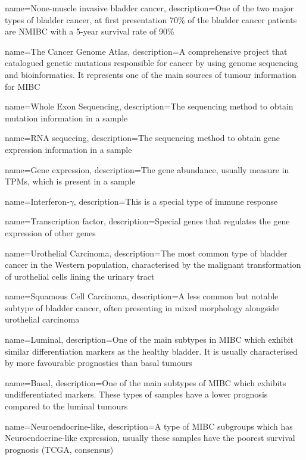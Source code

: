{
    name=None-muscle invasive bladder cancer,
    description={One of the two major types of bladder cancer, at first presentation 70\% of the bladder cancer patients are NMIBC with a 5-year survival rate of 90\%}
}

{
    name=The Cancer Genome Atlas,
    description={A comprehensive project that catalogued genetic mutations responsible for cancer by using genome sequencing and bioinformatics. It represents one of the main sources of tumour information for MIBC}
}

{
    name=Whole Exon Sequencing,
    description={The sequencing method to obtain mutation information in a sample}
}

{
    name=RNA sequecing,
    description={The sequencing method to obtain gene expression information in a sample}
}

{
    name=Gene expression,
    description={The gene abundance, usually measure in TPMs, which is present in a sample}
}

{
    name=Interferon-$\gamma$,
    description={This is a special type of immune response}
}

{
    name=Transcription factor,
    description={Special genes that regulates the gene expression of other genes}
}

{
    name=Urothelial Carcinoma,
    description={The most common type of bladder cancer in the Western population, characterised by the malignant transformation of urothelial cells lining the urinary tract}
}

{
    name=Squamous Cell Carcinoma,
    description={A less common but notable subtype of bladder cancer, often presenting in mixed morphology alongside urothelial carcinoma}
}


{
    name=Luminal,
    description={One of the main subtypes in MIBC which exhibit similar differentiation markers as the healthy bladder. It is usually characterised by more favourable prognostics than basal tumours}
}

{
    name=Basal,
    description={One of the main subtypes of MIBC which exhibits undifferentiated markers. These types of samples have a lower prognosis compared to the luminal tumours}
}



{
    name=Neuroendocrine-like,
    description={A type of MIBC subgroups which has Neuroendocrine-like expression, usually these samples have the poorest survival prognosis (TCGA, consensus)}
}

